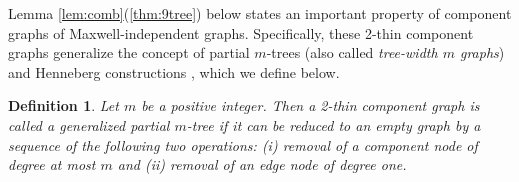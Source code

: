 \documentclass[10pt]{article}
\newtheorem{dfn}{Definition}
\begin{document}
\noindent
Lemma \ref{lem:comb}(\ref{thm:9tree}) below states an important property of component graphs of Maxwell-independent graphs. Specifically,  these 2-thin component graphs generalize the concept of partial $m$-trees (also called {\em tree-width $m$ graphs}) and Henneberg constructions \cite{graver:servatius:rigidityBook:1993}, which we define below.

\medskip
\noindent
\begin{dfn}\label{dfn:comppartialmTree}
Let $m$ be a positive integer. Then a 2-thin component graph is called a {\em generalized partial $m$-tree} if it can be reduced to an empty graph by a sequence of the 
following two operations: (i) removal of a component node of degree at most $m$ and 
(ii) removal of an edge node of degree one. 
\end{dfn}
\end{document}
